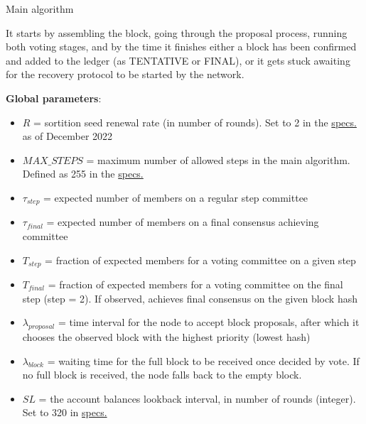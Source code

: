 \documentclass[10pt,a4paper]{article}
\begin{document}
\begin{section}{Main algorithm}
\begin{algorithm}[H]
\begin{algorithmic}[1]
    \EndFunction
    \end{algorithmic}
    \caption{\underline{Main node algorithm}}
\end{algorithm}

It starts by assembling the block, going through the proposal process,
running both voting stages, and by the time it finishes either a block has been
confirmed and added to the ledger (as TENTATIVE or FINAL), or it gets stuck awaiting for
the recovery protocol to be started by the network.



\noindent \textbf{Global parameters}:
\begin{itemize}
    \item $R$ = sortition seed renewal rate (in number of rounds). 
    Set to 2 in the \href{https://github.com/algorandfoundation/specs}{specs.}
    as of December 2022
    \item $MAX\_STEPS$ = maximum number of allowed steps in the main algorithm. Defined 
    as 255 in the \href{https://github.com/algorandfoundation/specs}{specs.}
    \item $\tau_{step}$ = expected number of members on a regular step committee
    \item $\tau_{final}$ = expected number of members on a final consensus achieving committee
    \item $T_{step}$ = fraction of expected members for a voting committee on a given step
    \item $T_{final}$ = fraction of expected members for a voting committee on the final step (step = 2). 
    If observed, achieves final consensus on the given block hash
    \item $\lambda_{proposal}$ = time interval for the node to accept block proposals, after
    which it chooses the observed block with the highest priority (lowest hash) 
    \item $\lambda_{block}$ = waiting time for the full block to be received once decided by vote.
    If no full block is received, the node falls back to the empty block.
    \item $SL$ = the account balances lookback interval, in number of rounds (integer). 
    Set to 320 in \href{https://github.com/algorandfoundation/specs}{specs.}
  \end{itemize}


\end{section}
\end{document}
